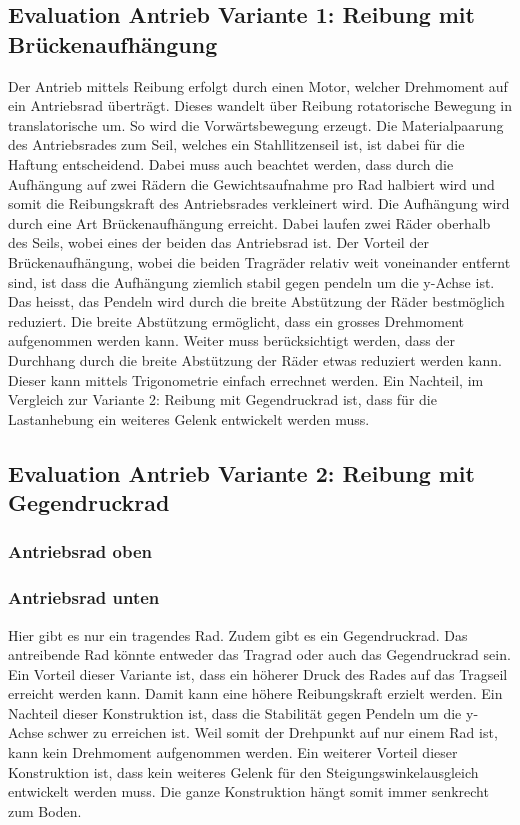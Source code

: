 \documentclass[a4paper]{report}
\begin{document}
\subsection{Evaluation Antrieb Variante 1: Reibung mit Brückenaufhängung}
Der Antrieb mittels Reibung erfolgt durch einen Motor, welcher Drehmoment auf ein Antriebsrad überträgt. Dieses wandelt über Reibung rotatorische Bewegung in translatorische um. So wird die Vorwärtsbewegung erzeugt. Die Materialpaarung des Antriebsrades zum Seil, welches ein Stahllitzenseil ist, ist dabei für die Haftung entscheidend. Dabei muss auch beachtet werden, dass durch die Aufhängung auf zwei Rädern die Gewichtsaufnahme pro Rad halbiert wird und somit die Reibungskraft des Antriebsrades verkleinert wird.
Die Aufhängung wird durch eine Art Brückenaufhängung erreicht. Dabei laufen zwei Räder oberhalb des Seils, wobei eines der beiden das Antriebsrad ist. Der Vorteil der Brückenaufhängung, wobei die beiden Tragräder relativ weit voneinander entfernt sind, ist dass die Aufhängung ziemlich stabil gegen pendeln um die y-Achse ist. Das heisst, das Pendeln wird durch die breite Abstützung der Räder bestmöglich reduziert. Die breite Abstützung ermöglicht, dass ein grosses Drehmoment aufgenommen werden kann. Weiter muss berücksichtigt werden, dass der Durchhang durch die breite Abstützung der Räder etwas reduziert werden kann. Dieser kann mittels Trigonometrie einfach errechnet werden. Ein Nachteil, im Vergleich zur Variante 2: Reibung mit Gegendruckrad ist, dass für die Lastanhebung ein weiteres Gelenk entwickelt werden muss.

\subsection{Evaluation Antrieb Variante 2: Reibung mit Gegendruckrad}
\subsubsection{Antriebsrad oben}
\subsubsection{Antriebsrad unten}
Hier gibt es nur ein tragendes Rad. Zudem gibt es ein Gegendruckrad. Das antreibende Rad könnte entweder das Tragrad oder auch das Gegendruckrad sein. Ein Vorteil dieser Variante ist, dass ein höherer Druck des Rades auf das Tragseil erreicht werden kann. Damit kann eine höhere Reibungskraft erzielt werden. Ein Nachteil dieser Konstruktion ist, dass die Stabilität gegen Pendeln um die y-Achse schwer zu erreichen ist. Weil somit der Drehpunkt auf nur einem Rad ist, kann kein Drehmoment aufgenommen werden. Ein weiterer Vorteil dieser Konstruktion ist, dass kein weiteres Gelenk für den Steigungswinkelausgleich entwickelt werden muss. Die ganze Konstruktion hängt somit immer senkrecht zum Boden.
\end{document}

